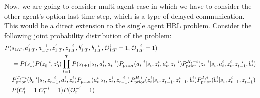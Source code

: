 \label{sec:chap4-multi-soft-HRL-communication}
Now, we are going to consider multi-agent case in which we have to consider the other agent's option last time step, which is a type of delayed communication. This would be a direct extension to the single agent HRL problem. Consider the following joint probability distribution of the problem:
\begin{equation}
\begin{aligned}
    P(&s_{1:T}, a^i_{1:T}, a^{-i}_{1:T}, z^i_{1:T}, z^{-i}_{1:T}, b^i_{1:T}, b^{-i}_{1:T}, \mathcal{O}^i_{1:T} = 1, \mathcal{O}^{-i}_{1:T} = 1) \\
    &= P(s_1)P(z^{-i}_0, z^i_0)\prod^T_{t=1} P(s_{t+1} | s_t, a_t^i, a_t^{-i})P_{\text{prior}}(a^{-i}_t | s_t, z^i_t, a^i_t, z^{-i}_t) P^{H,-i}_{\text{prior}}(z^{-i}_t | s_t, a^i_t, z^i_t, z^{-i}_{t-1}, b^i_t) \\
    &P^{T,-i}_{\text{prior}}(b^{-i}_t | s_t,  z^{-i}_{t-1}, a^i_t, z^i_t) P_{\text{prior}}(a^i_t | s_t, z^i_t, z^{-i}_{t-1}) P^{H,i}_{\text{prior}}(z^i_t | s_t, z^{-i}_{t-1}, z^i_{t-1}, b^i_t) P^{T,i}_{\text{prior}}(b^i_t | s_t, z^i_{t-1}, z^{-i}_{t-1})\\
    &P(\mathcal{O}^i_t = 1 | \mathcal{O}^{-i}_t = 1)P(\mathcal{O}^{-i}_t = 1)
\end{aligned}
\end{equation}
